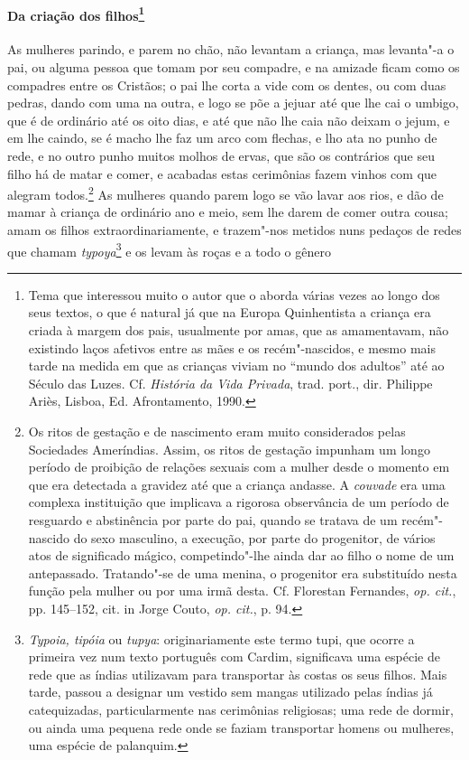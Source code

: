 \paragraph[Da criação dos filhos]{Da criação dos filhos\protect\footnote{ Tema que interessou muito o
autor que o aborda várias vezes ao longo dos seus textos, o que é
natural já que na Europa Quinhentista a criança era criada à margem dos
pais, usualmente por amas, que as amamentavam, não existindo laços
afetivos entre as mães e os recém"-nascidos, e mesmo mais tarde na
medida em que as crianças viviam no ``mundo dos adultos'' até ao Século
das Luzes. Cf. \textit{História da Vida Privada}, trad. port., dir.
Philippe Ariès, Lisboa, Ed. Afrontamento, 1990.}}

 As mulheres parindo, e parem no chão, não levantam a criança, mas
levanta"-a o pai, ou alguma pessoa que tomam por seu compadre, e na
amizade ficam como os compadres entre os Cristãos; o pai lhe corta a
vide com os dentes, ou com duas pedras, dando com uma na outra, e logo
se põe a jejuar até que lhe cai o umbigo, que é de ordinário até os
oito dias, e até que não lhe caia não deixam o jejum, e em lhe caindo,
se é macho lhe faz um arco com flechas, e lho ata no punho de rede, e
no outro punho muitos molhos de ervas, que são os contrários que seu
filho há de matar e comer, e acabadas estas cerimônias fazem vinhos com
que alegram todos.\footnote{ Os ritos de gestação e de nascimento eram
muito considerados pelas Sociedades Ameríndias. Assim, os ritos de
gestação impunham um longo período de proibição de relações sexuais com
a mulher desde o momento em que era detectada a gravidez até que a
criança andasse. A \textit{couvade} era uma complexa instituição que
implicava a rigorosa observância de um período de resguardo e
abstinência por parte do pai, quando se tratava de um recém"-nascido do
sexo masculino, a execução, por parte do progenitor, de vários atos de
significado mágico, competindo"-lhe ainda dar ao filho o nome de um
antepassado. Tratando"-se de uma menina, o progenitor era substituído
nesta função pela mulher ou por uma irmã desta. Cf. Florestan
Fernandes, \textit{op. cit.}, pp. 145--152, cit. in Jorge Couto, 
\textit{op. cit.}, p. 94.} As mulheres quando parem logo se vão lavar
aos rios, e dão de mamar à criança de ordinário ano e meio, sem lhe
darem de comer outra cousa; amam os filhos extraordinariamente, e
trazem"-nos metidos nuns pedaços de redes que chamam 
\textit{typoya}\footnote{ \textit{Typoia, tipóia} ou \textit{tupya}: originariamente
este termo tupi, que ocorre a primeira vez num texto português com
Cardim, significava uma espécie de rede que as índias utilizavam para
transportar às costas os seus filhos. Mais tarde, passou a designar um
vestido sem mangas utilizado pelas índias já catequizadas,
particularmente nas cerimônias religiosas; uma rede de dormir, ou ainda
uma pequena rede onde se faziam transportar homens ou mulheres, uma
espécie de palanquim.} e os levam às roças e a todo o gênero
